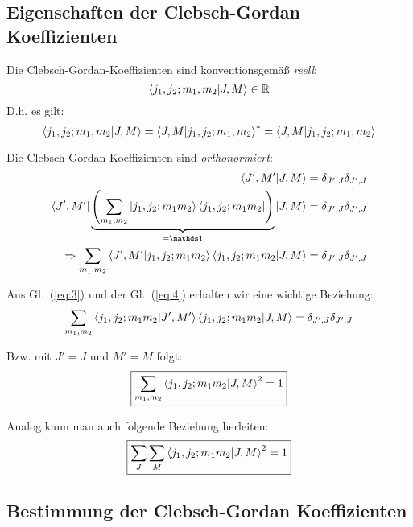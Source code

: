 \documentclass[12pt,a4paper,titlepage,oneside]{article}
\newcommand\bra[1]{\left\langle #1 \right|}
\newcommand\ket[1]{\left| #1 \right\rangle}
\newcommand\braket[2]{%
  \left\langle \vphantom{#2} #1%
    \middle|%
    \vphantom{#1} #2\right\rangle}%
\begin{document}
\subsection{Eigenschaften der Clebsch-Gordan Koeffizienten}
\label{sec:eigensch-der-clebsch}

Die Clebsch-Gordan-Koeffizienten sind konventionsgemäß \emph{reell}:
\begin{equation}
  \label{eq:2}
  \braket{j_1,j_2;m_1,m_2}{J,M} \in \mathbb R
\end{equation}
D.h. es gilt:
\begin{equation}
  \label{eq:3}
  \braket{j_1,j_2;m_1,m_2}{J,M} = \braket{J,M}{j_1,j_2;m_1,m_2}^*=
  \braket{J,M}{j_1,j_2;m_1,m_2}
\end{equation}

Die Clebsch-Gordan-Koeffizienten sind \emph{orthonormiert}:
\begin{align}
  \label{eq:4}
  \braket{J',M'}{J,M}&=\delta_{J',J}\delta_{J',J}\notag\\
  \bra{J',M'}\underbrace{\left(
      \sum_{m_1,m_2}\ket{j_1,j_2;m_1m_2}\bra{j_1,j_2;m_1m_2}\right)
  }_{=\mathds 1}
  \ket{J,M}&=\delta_{J',J}\delta_{J',J}\notag\\
  \Rightarrow\sum_{m_1,m_2}\braket{J',M'}{j_1,j_2;m_1m_2}
  \braket{j_1,j_2;m_1m_2}{J,M}&=\delta_{J',J}\delta_{J',J}
\end{align}

Aus Gl.~(\ref{eq:3}) und der Gl.~(\ref{eq:4}) erhalten wir eine wichtige Beziehung:
\begin{equation}
  \label{eq:5}
  \sum_{m_1,m_2}\braket{j_1,j_2;m_1m_2}{J',M'}
  \braket{j_1,j_2;m_1m_2}{J,M}=\delta_{J',J}\delta_{J',J}
\end{equation}

Bzw. mit \(J'=J\) und \(M'=M\) folgt:
\begin{equation}
  \label{eq:6}
  \boxed{\sum_{m_1,m_2}\braket{j_1,j_2;m_1m_2}{J,M}^2=1}
\end{equation}

Analog kann man auch folgende Beziehung herleiten:
\begin{equation}
  \label{eq:7}
  \boxed{\sum_{J}\sum_{M}\braket{j_1,j_2;m_1m_2}{J,M}^2=1}
\end{equation}

\subsection{Bestimmung der Clebsch-Gordan Koeffizienten}
\label{sec:best-der-clebsch}
\end{document}
